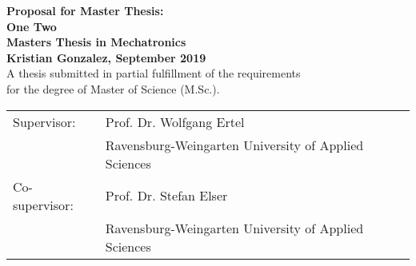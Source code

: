 
\begin{center}

\Large
\textbf{Proposal for Master Thesis:\\One Two}\\
\Large
\noindent \textbf{Masters Thesis in Mechatronics}\\
\noindent \textbf{Kristian Gonzalez, September 2019}\\
\normalsize 
A thesis submitted in partial fulfillment of the requirements\\ for the degree
of Master of Science (M.Sc.).

\end{center}

\begin{tabular}{ll}
Supervisor: & Prof. Dr. Wolfgang Ertel \\
 & Ravensburg-Weingarten University of Applied Sciences\\
Co-supervisor: & Prof. Dr. Stefan Elser\\
 & Ravensburg-Weingarten University of Applied Sciences\\
\end{tabular}

